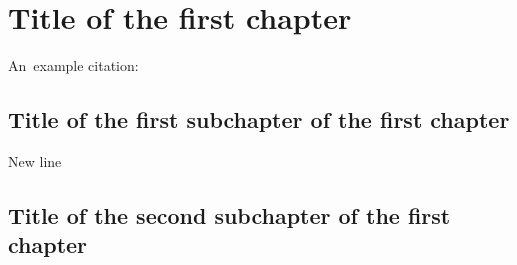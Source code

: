 \chapter{Title of the first chapter}

An~example citation: \cite{Andel07}

\section{Title of the first subchapter of the first chapter}

New line

\section{Title of the second subchapter of the first chapter}
